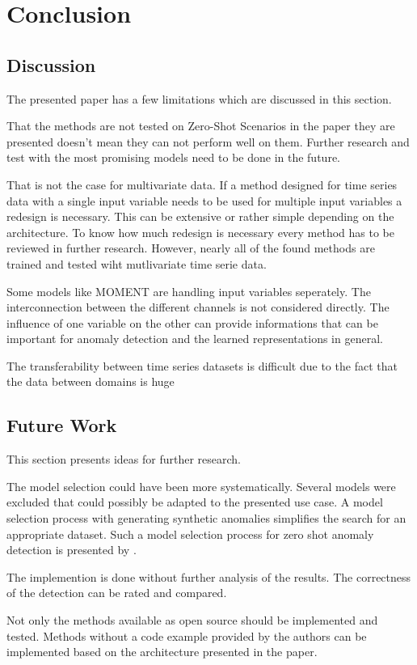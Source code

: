 \section{Conclusion}\label{discussion}
\subsection{Discussion}
The presented paper has a few limitations which are discussed in this section.

That the methods are not tested on Zero-Shot Scenarios in the paper they are presented doesn't mean they can not perform well on them.  Further research and test with the most promising models need to be done in the future.

That is not the case for multivariate data. If a method designed for time series data with a single input variable needs to be used for multiple input variables a redesign is necessary. This can be extensive or rather simple depending on the architecture. To know how much redesign is necessary every method has to be reviewed in further research. However, nearly all of the found methods are trained and tested wiht mutlivariate time serie data.

Some models like MOMENT are handling input variables seperately. The interconnection between the different channels is not considered directly. The influence of one variable on the other can provide informations that can be important for anomaly detection and the learned representations in general.


The transferability between time series datasets is difficult due to the fact that the data between domains is huge \cite{ma_survey_2023}

\subsection{Future Work}
This section presents ideas for further research.

The model selection could have been more systematically. Several models were excluded that could possibly be adapted to the presented use case. A model selection process with generating synthetic anomalies simplifies the search for an appropriate dataset. Such a model selection process for zero shot anomaly detection is presented by \cite{fung_model_2024}.

The implemention is done without further analysis of the results. The correctness of the detection can be rated and compared.

%
Not only the methods available as open source should be implemented and tested. Methods without a code example provided by the authors can be implemented based on the architecture presented in the paper.
